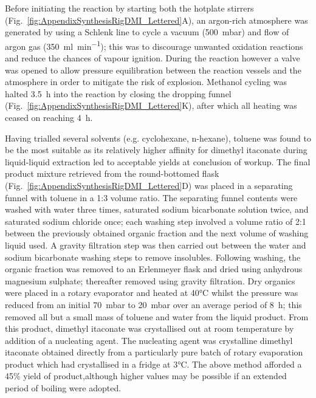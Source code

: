 Before initiating the reaction by starting both the hotplate stirrers
 (Fig.~\ref{fig:AppendixSynthesisRigDMI_Lettered}A), an argon-rich atmosphere was
 generated by using a Schlenk line to cycle a vacuum (500~\unit{\milli\bar})
 and flow of argon gas (350~\unit{\milli\litre\per\minute}); this was to 
 discourage unwanted oxidation reactions and reduce the chances of vapour 
 ignition.
During the reaction however a valve was opened to allow pressure 
 equilibration between the reaction vessels and the atmosphere in order to
 mitigate the risk of explosion.
Methanol cycling was halted 3.5~\unit{\hour} into the reaction by closing 
 the dropping funnel (Fig.~\ref{fig:AppendixSynthesisRigDMI_Lettered}K), after
 which all heating was ceased on reaching 4~\unit{\hour}.

Having trialled several solvents (e.g. cyclohexane, n-hexane), toluene 
 was found to be the most suitable as its relatively higher affinity for 
 dimethyl itaconate during liquid-liquid extraction led to acceptable
 yields at conclusion of workup.
The final product mixture retrieved from the round-bottomed flask
 (Fig.~\ref{fig:AppendixSynthesisRigDMI_Lettered}D) was placed in a separating funnel
 with toluene in a 1:3 volume ratio.
The separating funnel contents were washed with water three times, saturated
 sodium bicarbonate solution twice, and saturated sodium chloride once;
 each washing step involved a volume ratio of 2:1 between the previously
 obtained organic fraction and the next volume of washing liquid used.
A gravity filtration step was then carried out between the water and sodium
 bicarbonate washing steps to remove insolubles.
Following washing, the organic fraction was removed to an Erlenmeyer flask
 and dried using anhydrous magnesium sulphate; thereafter removed using
 gravity filtration.
Dry organics were placed in a rotary evaporator and heated at
 40\unit{\degreeCelsius} whilst the pressure was reduced from an initial
 70~\unit{\milli\bar} to 20~\unit{\milli\bar} over an average period of
 8~\unit{\hour}; this removed all but a small mass of toluene and water
 from the liquid product.
From this product, dimethyl itaconate was crystallised out at room
 temperature by addition of a nucleating agent.
The nucleating agent was crystalline dimethyl itaconate obtained directly
 from a particularly pure batch of rotary evaporation product which had
 crystallised in a fridge at 3\unit{\degreeCelsius}.
The above method afforded a 45\unit{\percent} yield of product,although 
 higher values may be possible if an extended period of boiling were 
 adopted.

